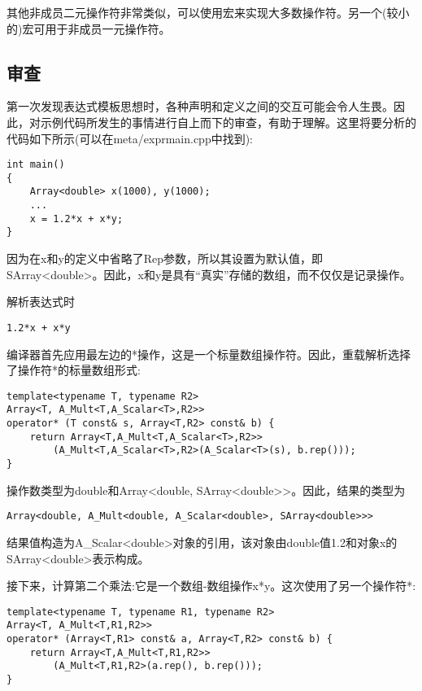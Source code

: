 其他非成员二元操作符非常类似，可以使用宏来实现大多数操作符。另一个(较小的)宏可用于非成员一元操作符。

\subsection{审查}

第一次发现表达式模板思想时，各种声明和定义之间的交互可能会令人生畏。因此，对示例代码所发生的事情进行自上而下的审查，有助于理解。这里将要分析的代码如下所示(可以在meta/exprmain.cpp中找到):

\begin{lstlisting}[style=styleCXX]
int main()
{
	Array<double> x(1000), y(1000);
	...
	x = 1.2*x + x*y;
}
\end{lstlisting}

因为在x和y的定义中省略了Rep参数，所以其设置为默认值，即SArray<double>。因此，x和y是具有“真实”存储的数组，而不仅仅是记录操作。

解析表达式时

\begin{lstlisting}[style=styleCXX]
1.2*x + x*y
\end{lstlisting}

编译器首先应用最左边的*操作，这是一个标量数组操作符。因此，重载解析选择了操作符*的标量数组形式:

\begin{lstlisting}[style=styleCXX]
template<typename T, typename R2>
Array<T, A_Mult<T,A_Scalar<T>,R2>>
operator* (T const& s, Array<T,R2> const& b) {
	return Array<T,A_Mult<T,A_Scalar<T>,R2>>
		(A_Mult<T,A_Scalar<T>,R2>(A_Scalar<T>(s), b.rep()));
}
\end{lstlisting}

操作数类型为double和Array<double, SArray<double>{}>。因此，结果的类型为

\begin{lstlisting}[style=styleCXX]
Array<double, A_Mult<double, A_Scalar<double>, SArray<double>>>
\end{lstlisting}

结果值构造为A\_Scalar<double>对象的引用，该对象由double值1.2和对象x的SArray<double>表示构成。

接下来，计算第二个乘法:它是一个数组-数组操作x*y。这次使用了另一个操作符*:

\begin{lstlisting}[style=styleCXX]
template<typename T, typename R1, typename R2>
Array<T, A_Mult<T,R1,R2>>
operator* (Array<T,R1> const& a, Array<T,R2> const& b) {
	return Array<T,A_Mult<T,R1,R2>>
		(A_Mult<T,R1,R2>(a.rep(), b.rep()));
}
\end{lstlisting}

